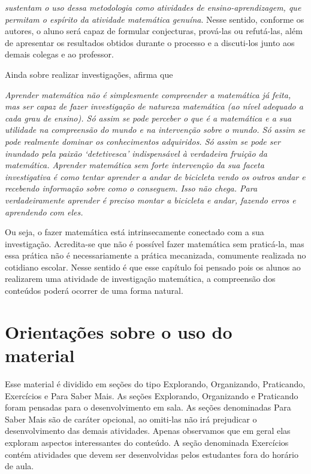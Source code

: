 \begin{apresentacao}
{\cite[p.23]{Ponte1} \textit{sustentam o uso dessa metodologia como atividades de ensino-aprendizagem, que permitam o espírito da atividade matemática genuína}. Nesse sentido, conforme os autores, o aluno será capaz de formular conjecturas, prová-las ou refutá-las, além de apresentar os resultados obtidos durante o processo e a discuti-los junto aos demais colegas e ao professor.

Ainda sobre realizar investigações, \cite[p.5]{Braumann} afirma que 

\textit{Aprender matemática não é simplesmente compreender a matemática já feita, mas ser capaz de fazer investigação de natureza matemática (ao nível adequado a cada grau de ensino). Só assim se pode perceber o que é a matemática e a sua utilidade na compreensão do mundo e na intervenção sobre o mundo. Só assim se pode realmente dominar os conhecimentos adquiridos. Só assim se pode ser inundado pela paixão ‘detetivesca’ indispensável à verdadeira fruição da matemática. Aprender matemática sem forte intervenção da sua faceta investigativa é como tentar aprender a andar de bicicleta vendo os outros andar e recebendo informação sobre como o conseguem. Isso não chega. Para verdadeiramente aprender é preciso montar a bicicleta e andar, fazendo erros e aprendendo com eles.} 

Ou seja, o fazer matemática está intrinsecamente conectado com a sua investigação. Acredita-se que não é possível fazer matemática sem praticá-la, mas essa prática não é necessariamente a prática mecanizada, comumente realizada no cotidiano escolar. Nesse sentido é que esse capítulo foi pensado pois os alunos ao realizarem uma atividade de investigação matemática, a compreensão dos conteúdos poderá ocorrer de uma forma natural. 

\section*{Orientações sobre o uso do material}

Esse material é dividido em seções do tipo Explorando, Organizando, Praticando, Exercícios e Para Saber Mais. As seções Explorando, Organizando e Praticando foram pensadas para o desenvolvimento em sala. As seções denominadas Para Saber Mais são de caráter opcional, ao omiti-las não irá prejudicar o desenvolvimento das demais atividades. Apenas observamos que em geral elas exploram aspectos interessantes do conteúdo. A seção denominada Exercícios contém atividades que devem ser desenvolvidas pelos estudantes fora do horário de aula. 

}
\end{apresentacao}
